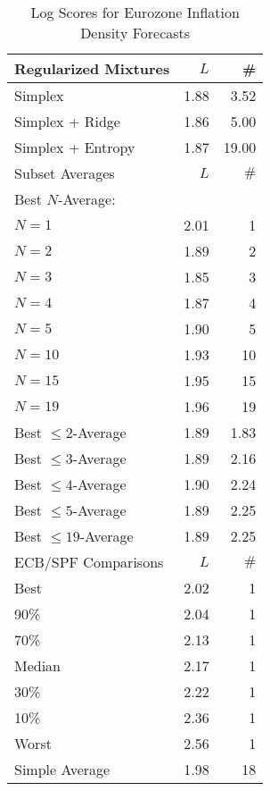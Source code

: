 \begin{table}[htp] 
\begin{center} 
\caption{Log Scores for Eurozone Inflation Density Forecasts} 
\begin{tabular}{lrr} 
\toprule 
\toprule 
Regularized Mixtures & $ L $ & \# \\ 
\midrule 
Simplex & 1.88 & 3.52 \\ 
Simplex + Ridge & 1.86 & 5.00 \\ 
Simplex + Entropy & 1.87 & 19.00 \\ 
\midrule 
\midrule 
Subset Averages & $ L $ & $\#$ \\ 
\midrule 
Best $N$-Average: &  & \\ 
\quad $N = 1$ & 2.01 & 1 \\ 
\quad $N = 2$ & 1.89 & 2 \\ 
\quad $N = 3$ & 1.85 & 3 \\ 
\quad $N = 4$ & 1.87 & 4 \\ 
\quad $N = 5$ & 1.90 & 5 \\ 
\quad $N = 10$ & 1.93 & 10 \\ 
\quad $N = 15$ & 1.95 & 15 \\ 
\quad $N = 19$ & 1.96 & 19 \\ 
Best $\leq 2$-Average & 1.89 & 1.83 \\ 
Best $\leq 3$-Average & 1.89 & 2.16 \\ 
Best $\leq 4$-Average & 1.90 & 2.24 \\ 
Best $\leq 5$-Average & 1.89 & 2.25 \\ 
Best $\leq 19$-Average & 1.89 & 2.25 \\ 
\midrule 
\midrule 
ECB/SPF Comparisons & $ L $ & $\#$ \\ 
\midrule 
Best & 2.02 & 1 \\ 
90\% & 2.04 & 1 \\ 
70\% & 2.13 & 1 \\ 
Median & 2.17 & 1 \\ 
30\% & 2.22 & 1 \\ 
10\% & 2.36 & 1 \\ 
Worst & 2.56 & 1 \\ 
\midrule 
Simple Average & 1.98 & 18 \\ 
\bottomrule 
\bottomrule 
\end{tabular} 
\end{center} 
\end{table} 
